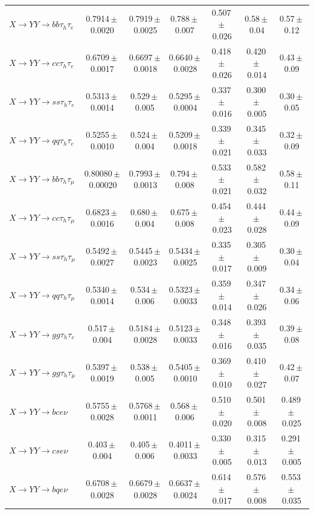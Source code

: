 \documentclass[12pt]{article}   %
\begin{document}
\begin{landscape}
{\begin{longtable}{@{\extracolsep{\fill}}lcccccc@{}}
$X\to YY\to bb\tau_h\tau_e$ & 0.7914\,$\pm$\,0.0020 & 0.7919\,$\pm$\,0.0025 & 0.788\,$\pm$\,0.007 & 0.507\,$\pm$\,0.026 & 0.58\,$\pm$\,0.04 & 0.57\,$\pm$\,0.12 \\
$X\to YY\to cc\tau_h\tau_e$ & 0.6709\,$\pm$\,0.0017 & 0.6697\,$\pm$\,0.0018 & 0.6640\,$\pm$\,0.0028 & 0.418\,$\pm$\,0.026 & 0.420\,$\pm$\,0.014 & 0.43\,$\pm$\,0.09 \\
$X\to YY\to ss\tau_h\tau_e$ & 0.5313\,$\pm$\,0.0014 & 0.529\,$\pm$\,0.005 & 0.5295\,$\pm$\,0.0004 & 0.337\,$\pm$\,0.016 & 0.300\,$\pm$\,0.005 & 0.30\,$\pm$\,0.05 \\
$X\to YY\to qq\tau_h\tau_e$ & 0.5255\,$\pm$\,0.0010 & 0.524\,$\pm$\,0.004 & 0.5209\,$\pm$\,0.0018 & 0.339\,$\pm$\,0.021 & 0.345\,$\pm$\,0.033 & 0.32\,$\pm$\,0.09 \\
$X\to YY\to bb\tau_h\tau_\mu$ & 0.80080\,$\pm$\,0.00020 & 0.7993\,$\pm$\,0.0013 & 0.794\,$\pm$\,0.008 & 0.533\,$\pm$\,0.021 & 0.582\,$\pm$\,0.032 & 0.58\,$\pm$\,0.11 \\
$X\to YY\to cc\tau_h\tau_\mu$ & 0.6823\,$\pm$\,0.0016 & 0.680\,$\pm$\,0.004 & 0.675\,$\pm$\,0.008 & 0.454\,$\pm$\,0.023 & 0.444\,$\pm$\,0.028 & 0.44\,$\pm$\,0.09 \\
$X\to YY\to ss\tau_h\tau_\mu$ & 0.5492\,$\pm$\,0.0027 & 0.5445\,$\pm$\,0.0023 & 0.5434\,$\pm$\,0.0025 & 0.335\,$\pm$\,0.017 & 0.305\,$\pm$\,0.009 & 0.30\,$\pm$\,0.04 \\
$X\to YY\to qq\tau_h\tau_\mu$ & 0.5340\,$\pm$\,0.0014 & 0.534\,$\pm$\,0.006 & 0.5323\,$\pm$\,0.0033 & 0.359\,$\pm$\,0.014 & 0.347\,$\pm$\,0.026 & 0.34\,$\pm$\,0.06 \\
$X\to YY\to gg\tau_h\tau_e$ & 0.517\,$\pm$\,0.004 & 0.5184\,$\pm$\,0.0028 & 0.5123\,$\pm$\,0.0033 & 0.348\,$\pm$\,0.016 & 0.393\,$\pm$\,0.035 & 0.39\,$\pm$\,0.08 \\
$X\to YY\to gg\tau_h\tau_\mu$ & 0.5397\,$\pm$\,0.0019 & 0.538\,$\pm$\,0.005 & 0.5405\,$\pm$\,0.0010 & 0.369\,$\pm$\,0.010 & 0.410\,$\pm$\,0.027 & 0.42\,$\pm$\,0.07 \\
\midrule
$X\to YY\to bce\nu$ & 0.5755\,$\pm$\,0.0028 & 0.5768\,$\pm$\,0.0011 & 0.568\,$\pm$\,0.006 & 0.510\,$\pm$\,0.020 & 0.501\,$\pm$\,0.008 & 0.489\,$\pm$\,0.025 \\
$X\to YY\to cse\nu$ & 0.403\,$\pm$\,0.004 & 0.405\,$\pm$\,0.006 & 0.4011\,$\pm$\,0.0033 & 0.330\,$\pm$\,0.005 & 0.315\,$\pm$\,0.013 & 0.291\,$\pm$\,0.005 \\
$X\to YY\to bqe\nu$ & 0.6708\,$\pm$\,0.0028 & 0.6679\,$\pm$\,0.0028 & 0.6637\,$\pm$\,0.0024 & 0.614\,$\pm$\,0.017 & 0.576\,$\pm$\,0.008 & 0.553\,$\pm$\,0.035 \\

\end{longtable}}
\end{landscape}
\end{document}
